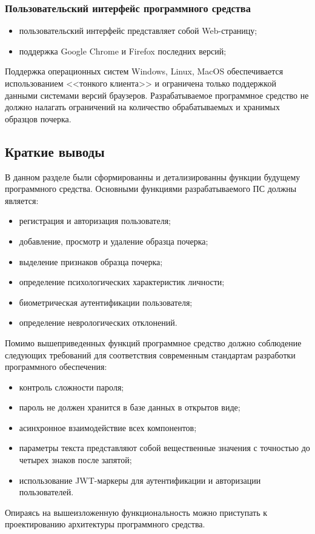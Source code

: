 \subsubsection{Пользовательский интерфейс программного средства}
\begin{itemize}
	\item пользовательский интерфейс представляет собой Web-страницу;
	\item поддержка Google Chrome и Firefox последних версий;
\end{itemize}

Поддержка операционных систем Windows, Linux, MacOS обеспечивается использованием <<тонкого клиента>> и ограничена только поддержкой данными системами версий браузеров.
Разрабатываемое программное средство не должно налагать ограничений на количество обрабатываемых и хранимых образцов почерка.

\subsection{Краткие выводы}
В данном разделе были сформированны и детализированны функции будущему программного средства.
Основными функциями разрабатываемого ПС должны является:
\begin{itemize}
	\item регистрация и авторизация пользователя;
	\item добавление, просмотр и удаление образца почерка;
	\item выделение признаков образца почерка;
	\item определение психологических характеристик личности;
	\item биометрическая аутентификации пользователя;
	\item определение неврологических отклонений.
\end{itemize}

Помимо вышеприведенных функций программное средство должно соблюдение следующих требований для соответствия современным стандартам разработки программного обеспечения:
\begin{itemize}
  \item контроль сложности пароля;
  \item пароль не должен хранится в базе данных в открытов виде;
  \item асинхронное взаимодействие всех компонентов;
  \item параметры текста представляют собой вещественные значения с точностью до четырех знаков после запятой;
  \item использование JWT-маркеры для аутентификации и авторизации пользователей.
\end{itemize}

Опираясь на вышеизложенную функциональность можно приступать к проектированию архитектуры программного средства.